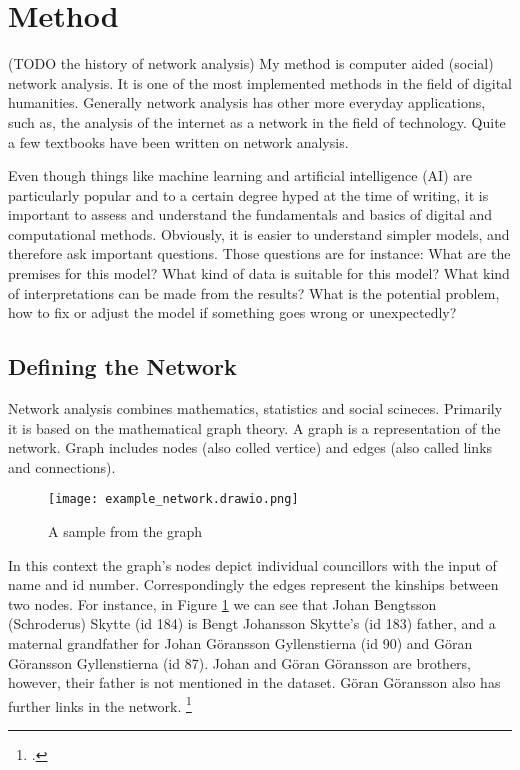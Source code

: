 \section{Method}
\label{method}

(TODO the history of network analysis)
My method is computer aided (social) network analysis. It is one of the most implemented methods in the field of digital humanities. Generally network analysis has other more everyday applications, such as, the analysis of the internet as a network in the field of technology. Quite a few textbooks have been written on network analysis.
 

Even though things like machine learning and artificial intelligence (AI) are particularly popular and to a certain degree hyped at the time of writing, it is important to assess and understand the fundamentals and basics of digital and computational methods. Obviously, it is easier to understand simpler models, and therefore ask important questions. Those questions are for instance: What are the premises for this model? What kind of data is suitable for this model? What kind of interpretations can be made from the results? What is the potential problem, how to fix or adjust the model if something goes wrong or unexpectedly?

\subsection{Defining the Network}
\label{network}
Network analysis combines mathematics, statistics and social scineces. Primarily it is based on the mathematical graph theory. A graph is a representation of the network. Graph includes nodes (also colled vertice) and edges (also called links and connections).

\begin{figure}
	\texttt{[image: example\_network.drawio.png]}
	\centering
	\caption{A sample from the graph} 
	\centering
	\label{samplegraph}
\end{figure}
In this context the graph's nodes depict individual councillors with the input of name and id number. Correspondingly the edges represent the kinships between two nodes. For instance, in Figure \ref{samplegraph} we can see that Johan Bengtsson (Schroderus) Skytte (id 184) is Bengt Johansson Skytte's (id 183) father, and a maternal grandfather for Johan Göransson Gyllenstierna (id 90) and Göran Göransson Gyllenstierna (id 87). Johan and Göran Göransson are brothers, however, their father is not mentioned in the dataset. Göran Göransson also has further links in the network. \footcite{councillorsDS}


